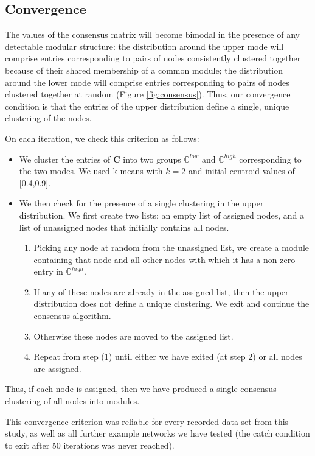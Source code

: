 \documentclass[11pt,a4paper]{article}
\begin{document}
\subsection{Convergence}
The values of the consensus matrix will become bimodal in the presence of any detectable modular structure: the distribution around the upper mode will comprise entries corresponding to pairs of nodes consistently clustered together because of their shared membership of a common module; the distribution around the lower mode will comprise entries corresponding to pairs of nodes clustered together at random (Figure \ref{fig:consensus}). Thus, our convergence condition is that the entries of the upper distribution define a single, unique clustering of the nodes.

On each iteration, we check this criterion as follows:
\begin{itemize}
\item We cluster the entries of $\mathbf{C}$ into two groups $\mathbb{C}^{low}$ and $\mathbb{C}^{high}$ corresponding to the two modes. We used k-means with $k=2$ and initial centroid values of [0.4,0.9].
\item We then check for the presence of a single clustering in the upper distribution. We first create two lists: an empty list of assigned nodes, and a list of unassigned nodes that initially contains all nodes.
    \begin{enumerate}
        \item Picking any node at random from the unassigned list, we create a module containing that node and all other nodes with which it has a non-zero entry in $\mathbb{C}^{high}$.
        \item If any of these nodes are already in the assigned list, then the upper distribution does not define a unique clustering. We exit and continue the consensus algorithm.
        \item Otherwise these nodes are moved to the assigned list.
        \item Repeat from step (1) until either we have exited (at step 2) or all nodes are assigned.
    \end{enumerate}
\end{itemize}
Thus, if each node is assigned, then we have produced a single consensus clustering of all nodes into modules.


This convergence criterion was reliable for every recorded data-set from this study, as well as all further example networks we have tested (the catch condition to exit after 50 iterations was never reached). 
\end{document}
